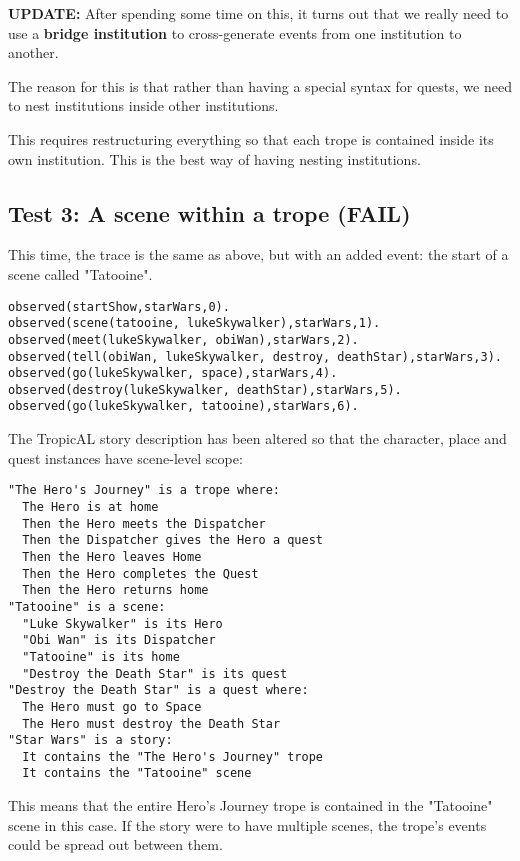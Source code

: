 \documentclass[11pt]{article}
\begin{document}
\textbf{UPDATE:} After spending some time on this, it turns out that we really need to use a \textbf{bridge institution} to cross-generate events from one institution to another. 

The reason for this is that rather than having a special syntax for quests, we need to nest institutions inside other institutions.

This requires restructuring everything so that each trope is contained inside its own institution. This is the best way of having nesting institutions.


\subsection{Test 3: A scene within a trope (FAIL)}
\label{sec:orgheadline3}

This time, the trace is the same as above, but with an added event: the start of a scene called "Tatooine".

\begin{verbatim}
observed(startShow,starWars,0).
observed(scene(tatooine, lukeSkywalker),starWars,1).
observed(meet(lukeSkywalker, obiWan),starWars,2).
observed(tell(obiWan, lukeSkywalker, destroy, deathStar),starWars,3).
observed(go(lukeSkywalker, space),starWars,4).
observed(destroy(lukeSkywalker, deathStar),starWars,5).
observed(go(lukeSkywalker, tatooine),starWars,6).
\end{verbatim}

The TropicAL story description has been altered so that the character, place and quest instances have scene-level scope:

\begin{verbatim}
"The Hero's Journey" is a trope where:
  The Hero is at home
  Then the Hero meets the Dispatcher
  Then the Dispatcher gives the Hero a quest
  Then the Hero leaves Home
  Then the Hero completes the Quest
  Then the Hero returns home
"Tatooine" is a scene:
  "Luke Skywalker" is its Hero
  "Obi Wan" is its Dispatcher
  "Tatooine" is its home
  "Destroy the Death Star" is its quest
"Destroy the Death Star" is a quest where:
  The Hero must go to Space
  The Hero must destroy the Death Star
"Star Wars" is a story:
  It contains the "The Hero's Journey" trope
  It contains the "Tatooine" scene
\end{verbatim}

This means that the entire Hero's Journey trope is contained in the "Tatooine" scene in this case. If the story were to have multiple scenes, the trope's events could be spread out between them.
\end{document}

